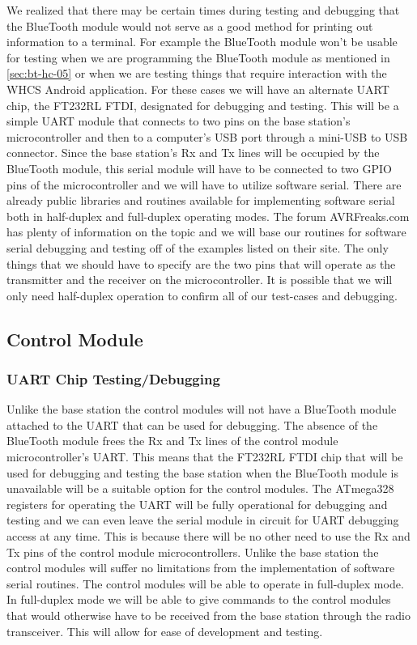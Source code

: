 We realized that there may be certain times during testing and debugging that
the BlueTooth module would not serve as a good method for printing out
information to a terminal. For example the BlueTooth module won't be
usable for testing when we are programming the BlueTooth module as mentioned in
\autoref{sec:bt-hc-05} or when we are testing things that require interaction with the
WHCS Android application. For these cases we will have an alternate UART chip,
the FT232RL FTDI, designated for debugging and testing. This will be a simple
UART module that connects to two pins on the base station's
microcontroller and then to a computer's USB port through a mini-USB to
USB connector. Since the base station's Rx and Tx lines will be
occupied by the BlueTooth module, this serial module will have to be connected
to two GPIO pins of the microcontroller and we will have to utilize software
serial. There are already public libraries and routines available for
implementing software serial both in half-duplex and full-duplex operating
modes. The forum AVRFreaks.com has plenty of information on the topic and we
will base our routines for software serial debugging and testing off of the
examples listed on their site. The only things that we should have to specify
are the two pins that will operate as the transmitter and the receiver on the
microcontroller. It is possible that we will only need half-duplex operation to
confirm all of our test-cases and debugging.

\subsection{Control Module}

\subsubsection{UART Chip Testing/Debugging}
Unlike the base station the control modules will not have a BlueTooth module
attached to the UART that can be used for debugging. The absence of the
BlueTooth module frees the Rx and Tx lines of the control module
microcontroller{}'s UART. This means that the FT232RL FTDI chip that will be
used for debugging and testing the base station when the BlueTooth module is
unavailable will be a suitable option for the control modules. The ATmega328
registers for operating the UART will be fully operational for debugging and
testing and we can even leave the serial module in circuit for UART debugging
access at any time. This is because there will be no other need to use the Rx
and Tx pins of the control module microcontrollers. Unlike the base station the
control modules will suffer no limitations from the implementation of software
serial routines. The control modules will be able to operate in full{}-duplex
mode. In full{}-duplex mode we will be able to give commands to the control
modules that would otherwise have to be received from the base station through
the radio transceiver. This will allow for ease of development and testing.

